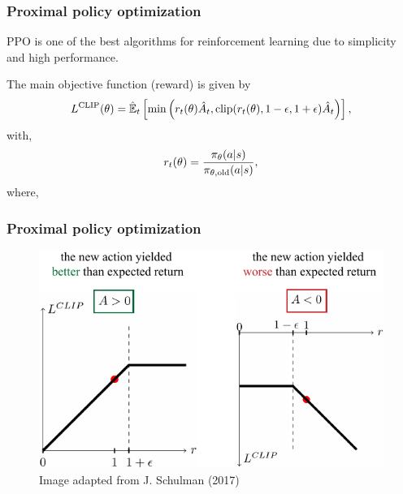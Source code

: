 \begin{frame}
	\frametitle{Proximal policy optimization}
	
	PPO is one of the best algorithms for reinforcement learning due to simplicity and high performance\footnotemark[1].
	
	\begin{center}
		\begin{minipage}{9cm}
			\begin{myexampleblock}[9cm]{}
				The main objective function {\color{gray} (reward)} is given by
				\begin{equation*}
					L^{\mathrm{CLIP}}(\theta) = \hat{\mathbb{E}}_{t} \left[ \mathrm{min} \left(  r_{t}(\theta)  \hat{A}_{t},  \mathrm{clip} (r_{t}(\theta) , 1-\epsilon, 1+\epsilon) \hat{A}_{t}  \right)  \right],			
				\end{equation*}	
				with,
				\begin{equation*}
					r_{t}(\theta) =\frac{\pi_{\theta}(a|s)}{\pi_{\theta, \mathrm{old}}(a|s) },
				\end{equation*}
				where,
				\newline
				\hspace{10px}
			\end{myexampleblock}
		\end{minipage}
	\end{center}
	
\end{frame}

\begin{frame}
	\frametitle{Proximal policy optimization}
	\begin{figure}
		\centering
		\includegraphics{advantage.pdf}
		\caption{Image adapted from J. Schulman (2017)}
	\end{figure}
	
\end{frame}

